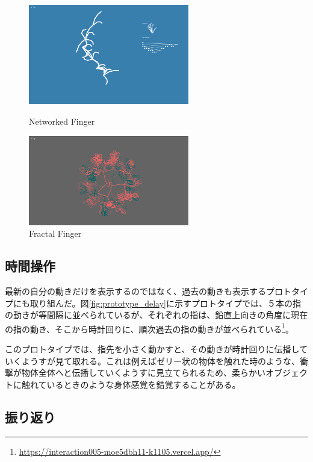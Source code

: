 \begin{figure}[htbp]
  \begin{minipage}[b]{0.5\linewidth}
    \centering
    \includegraphics[keepaspectratio, width=7cm]{img/networked_finger.png}
    \caption{Networked Finger}
    \label{fig:networked_finger}
  \end{minipage}
  \begin{minipage}[b]{0.5\linewidth}
    \centering
    \includegraphics[keepaspectratio, width=7cm]{img/fractel_finger.png}
    \caption{Fractal Finger}
    \label{fig:fractal_finger}
  \end{minipage}
\end{figure}
\subsection*{時間操作}
最新の自分の動きだけを表示するのではなく、過去の動きも表示するプロトタイプにも取り組んだ。図\ref{fig:prototype_delay}に示すプロトタイプでは、５本の指の動きが等間隔に並べられているが、それぞれの指は、鉛直上向きの角度に現在の指の動き、そこから時計回りに、順次過去の指の動きが並べられている\footnote{\url{https://interaction005-moe5dbh11-k1105.vercel.app/}}。

このプロトタイプでは、指先を小さく動かすと、その動きが時計回りに伝播していくようすが見て取れる。これは例えばゼリー状の物体を触れた時のような、衝撃が物体全体へと伝播していくようすに見立てられるため、柔らかいオブジェクトに触れているときのような身体感覚を錯覚することがある。

\subsection*{振り返り}

